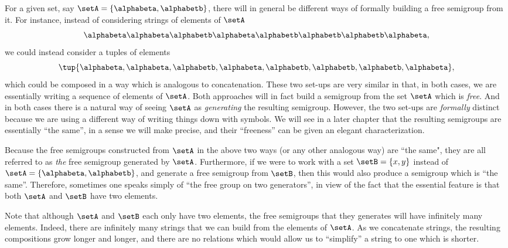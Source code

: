 For a given set, say $\setA = \{ \alphabeta, \alphabetb\}$, there will in general be different ways of formally building a free semigroup from it. For instance, instead of considering strings of elements of $\setA$
\begin{equation}
    \alphabeta\alphabeta \alphabetb \alphabeta \alphabetb \alphabetb \alphabetb \alphabeta,
  \end{equation}
 we could instead consider a tuples of elements
\begin{equation}
   \tup{ \alphabeta, \alphabeta,  \alphabetb,  \alphabeta,  \alphabetb,  \alphabetb,  \alphabetb,  \alphabeta},
  \end{equation}
which could be composed in a way which is analogous to concatenation. These two set-ups are very similar in that, in both cases, we are essentially writing a sequence of elements of $\setA$. Both approaches will in fact build a semigroup from the set $\setA$ which is \emph{free}. And in both cases there is a natural way of seeing $\setA$ as \emph{generating} the resulting semigroup. However, the two set-ups are \emph{formally} distinct because we are using a different way of writing things down with symbols. We will see in a later chapter that the resulting semigroups are essentially ``the same'', in a sense we will make precise, and their ``freeness'' can be given an elegant characterization.

Because the free semigroups constructed from $\setA$ in the above two ways (or any other analogous way) are ``the same", they are all referred to as \emph{the} free semigroup generated by $\setA$. Furthermore, if we were to work with a set $\setB = \{ x, y \}$ instead of $\setA = \{ \alphabeta, \alphabetb\}$, and generate a free semigroup from $\setB$, then this would also produce a semigroup which is ``the same''. Therefore, sometimes one speaks simply of ``the free group on two generators'', in view of the fact that the essential feature is that both $\setA$ and $\setB$ have two elements.

Note that although $\setA$ and $\setB$ each only have two elements, the free semigroups that they generates will have infinitely many elements. Indeed, there are infinitely many strings that we can build from the elements of $\setA$. As we concatenate strings, the resulting compositions grow longer and longer, and there are no relations which would allow us to ``simplify'' a string to one which is shorter.



